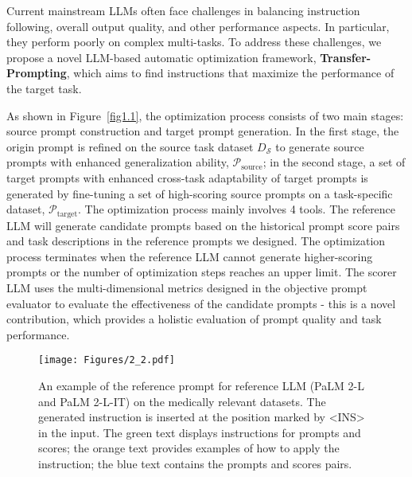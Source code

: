 Current mainstream LLMs often face challenges in balancing instruction following, overall output quality, and other performance aspects. In particular, they perform poorly on complex multi-tasks. To address these challenges, we propose a novel LLM-based automatic optimization framework, \textbf{Transfer-Prompting}, which aims to find instructions that maximize the performance of the target task.

As shown in Figure~\ref{fig1.1}, the optimization process consists of two main stages: source prompt construction and target prompt generation.
In the first stage, the origin prompt is refined on the source task dataset $D_{\mathcal{S}}$ to generate source prompts with enhanced generalization ability, $\mathcal{P}_{\text{source}}$; in the second stage, a set of target prompts with enhanced cross-task adaptability of target prompts is generated by fine-tuning a set of high-scoring source prompts on a task-specific dataset, $\mathcal{P}_{\text{target}}$.
The optimization process mainly involves 4 tools. The reference LLM will generate candidate prompts based on the historical prompt score pairs and task descriptions in the reference prompts we designed. The optimization process terminates when the reference LLM cannot generate higher-scoring prompts or the number of optimization steps reaches an upper limit. The scorer LLM uses the multi-dimensional metrics designed in the objective prompt evaluator to evaluate the effectiveness of the candidate prompts - this is a novel contribution, which provides a holistic evaluation of prompt quality and task performance.

\begin{figure*}[!t]
\centering
\texttt{[image: Figures/2\_2.pdf]}
\hfill
\caption{An example of the reference prompt for reference LLM (PaLM 2-L and PaLM 2-L-IT) on the medically relevant datasets. The generated instruction is inserted at the position marked by <INS> in the input. The \textcolor{lightblackgreen}{green} text displays instructions for prompts and scores; the \textcolor{lightblackorange}{orange} text provides examples of how to apply the instruction; the \textcolor{lightblackblue}{blue} text contains the prompts and scores pairs.
}
\label{fig: transfer-prompting}
\end{figure*}


